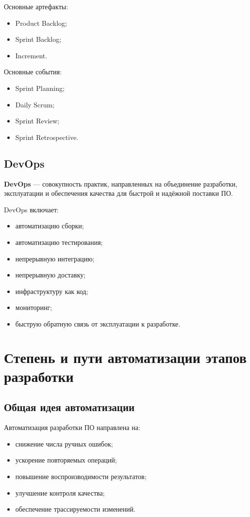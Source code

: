 \documentclass[12pt,a4paper]{article}
\begin{document}
Основные артефакты:
\begin{itemize}
    \item Product Backlog;
    \item Sprint Backlog;
    \item Increment.
\end{itemize}

Основные события:
\begin{itemize}
    \item Sprint Planning;
    \item Daily Scrum;
    \item Sprint Review;
    \item Sprint Retrospective.
\end{itemize}

\subsection{DevOps}

\textbf{DevOps} --- совокупность практик, направленных на объединение разработки, эксплуатации и обеспечения качества для быстрой и надёжной поставки ПО.

DevOps включает:
\begin{itemize}
    \item автоматизацию сборки;
    \item автоматизацию тестирования;
    \item непрерывную интеграцию;
    \item непрерывную доставку;
    \item инфраструктуру как код;
    \item мониторинг;
    \item быструю обратную связь от эксплуатации к разработке.
\end{itemize}

\section{Степень и пути автоматизации этапов разработки}

\subsection{Общая идея автоматизации}

Автоматизация разработки ПО направлена на:
\begin{itemize}
    \item снижение числа ручных ошибок;
    \item ускорение повторяемых операций;
    \item повышение воспроизводимости результатов;
    \item улучшение контроля качества;
    \item обеспечение трассируемости изменений.
\end{itemize}
\end{document}
